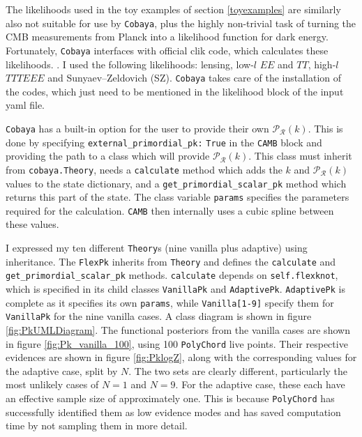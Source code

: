\documentclass{article}
\begin{document}
The likelihoods used in the toy examples of section \ref{toyexamples} are similarly also not suitable for use by \texttt{Cobaya}, plus the highly non-trivial task of turning the CMB measurements from Planck into a likelihood function for dark energy. Fortunately, \texttt{Cobaya} interfaces with official clik code, which calculates these likelihoods. \cite{planck_likelihoods_1, planck_likelihoods_2}. I used the following likelihoods: lensing, low-$l$ $EE$ and $TT$, high-$l$ $TTTEEE$ and Sunyaev–Zeldovich (SZ). \texttt{Cobaya} takes care of the installation of the codes, which just need to be mentioned in the likelihood block of the input yaml file.

\texttt{Cobaya} has a built-in option for the user to provide their own $\mathcal P_\mathcal R(k)$. This is done by specifying \texttt{external\_primordial\_pk:} \texttt{True} in the \texttt{CAMB} block and providing the path to a class which will provide $\mathcal P_\mathcal R(k)$. This class must inherit from \texttt{cobaya.Theory}, needs a \texttt{calculate} method which adds the $k$ and $\mathcal P_\mathcal R(k)$ values to the state dictionary, and a \texttt{get\_primordial\_scalar\_pk} method which returns this part of the state. The class variable \texttt{params} specifies the parameters required for the calculation. \texttt{CAMB} then internally uses a cubic spline between these values.

I expressed my ten different \texttt{Theory}s (nine vanilla plus adaptive) using inheritance. The \texttt{FlexPk} inherits from \texttt{Theory} and defines the \texttt{calculate} and \texttt{get\_primordial\_scalar\_pk} methods. \texttt{calculate} depends on \texttt{self.flexknot}, which is specified in its child classes \texttt{VanillaPk} and \texttt{AdaptivePk}. \texttt{AdaptivePk} is complete as it specifies its own \texttt{params}, while \texttt{Vanilla[1-9]} specify them for  \texttt{VanillaPk} for the nine vanilla cases. A class diagram is shown in figure \ref{fig:PkUMLDiagram}. The functional posteriors from the vanilla cases are shown in figure \ref{fig:Pk_vanilla_100}, using 100 \texttt{PolyChord} live points. Their respective evidences are shown in figure \ref{fig:PklogZ}, along with the corresponding values for the adaptive case, split by $N$. The two sets are clearly different, particularly the most unlikely cases of $N=1$ and $N=9$. For the adaptive case, these each have an effective sample size of approximately one. This is because \texttt{PolyChord} has successfully identified them as low evidence modes and has saved computation time by not sampling them in more detail.
\end{document}
